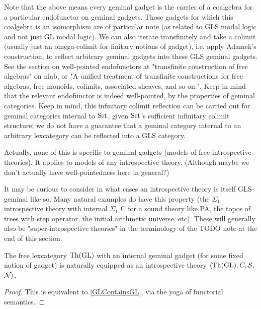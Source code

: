 \documentclass[./main.tex]{subfiles}
\begin{document}
\begin{TODOblock}
Note that the above means every geminal gadget is the carrier of a coalgebra for a particular endofunctor on geminal gadgets. Those gadgets for which this coalgebra is an isomorphism are of particular note (as related to GLS modal logic and not just GL modal logic). We can also iterate transfinitely and take a colimit (usually just an omega-colimit for finitary notions of gadget), i.e. apply Adamek's construction, to reflect arbitrary geminal gadgets into these GLS geminal gadgets. See the section on well-pointed endofunctors at "transfinite construction of free algebras" on nlab, or "A unified treatment of transfinite constructions for free algebras, free monoids, colimits, associated sheaves, and so on.". Keep in mind that the relevant endofunctor is indeed well-pointed, by the properties of geminal categories. Keep in mind, this infinitary colimit reflection can be carried out for geminal categories internal to $\mathrm{Set}$, given $\mathrm{Set}$'s sufficient infinitary colimit structure; we do not have a guarantee that a geminal category internal to an arbitrary lexcategory can be reflected into a GLS category.

Actually, none of this is specific to geminal gadgets (models of free introspective theories). It applies to models of any introspective theory. (Although maybe we don't actually have well-pointedness here in general?)

It may be curious to consider in what cases an introspective theory is itself GLS-geminal like so. Many natural examples do have this property (the $\Sigma_1$ introspective theory with internal $\Sigma_1$ C for a sound theory like PA, the topos of trees with step operator, the initial arithmetic universe, etc). These will generally also be "super-introspective theories" in the terminology of the TODO note at the end of this section.
\end{TODOblock}

\begin{corollary}\label{GLCatTheoryIsIntrosp}
The free lexcategory $\mathrm{Th}(\mathrm{GL})$ with an internal geminal gadget (for some fixed notion of gadget) is naturally equipped as an introspective theory $\langle \mathrm{Th}(\mathrm{GL}), C, \mathcal{S}, $ $\mathcal{N} \rangle$.
\end{corollary}
\begin{proof}
This is equivalent to \cref{GLContainsGL}, via the yoga of functorial semantics.
\end{proof}
\end{document}
